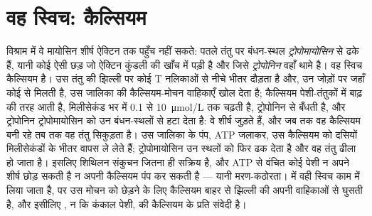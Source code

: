 \section{वह स्विच: कैल्सियम}

\begin{proposition}[उत्तेजन--संकुचन युग्मन]\label{prop:b2:muscle-movement:coupling}
विश्राम में वे मायोसिन शीर्ष ऐक्टिन तक पहुँच नहीं सकते: पतले तंतु पर
बंधन-स्थल \emph{ट्रोपोमायोसिन} से ढके हैं, यानी कोई ऐसी छड़
जो ऐक्टिन कुंडली की खाँच में पड़ी है और जिसे \emph{ट्रोपोनिन} वहाँ थामे है।
वह स्विच कैल्सियम है। उस तंतु की झिल्ली पर कोई 
T नलिकाओं से नीचे भीतर दौड़ता है और, उन जोड़ों पर
जहाँ कोई   से मिलती है, उस
जालिका की कैल्सियम-मोचन वाहिकाएँ खोल देता है; कैल्सियम पेशी-तंतुकों में बाढ़ की तरह आती है,
मिलीसेकंड भर में \qty{0.1}{} से \qty{10}{\micro mol/L} तक चढ़ती है,
ट्रोपोनिन से बँधती है, और ट्रोपोनिन ट्रोपोमायोसिन को उन बंधन-स्थलों से
हटा देता है: वे शीर्ष जुड़ते हैं, और जब तक वह कैल्सियम बनी रहे तब तक वह तंतु सिकुड़ता है।
उस जालिका के पंप, ATP जलाकर, उस कैल्सियम को
दसियों मिलीसेकंडों के भीतर वापस ले लेते हैं; ट्रोपोमायोसिन उन
स्थलों को फिर ढक देता है और वह तंतु ढीला हो जाता है। इसलिए शिथिलन
संकुचन जितना ही सक्रिय है, और ATP से वंचित कोई पेशी न अपने
शीर्ष छोड़ सकती है न अपनी कैल्सियम पंप कर सकती है --- यानी मरण-कठोरता।  में वही
स्विच काम में लिया जाता है, पर उस मोचन को छेड़ने के लिए कैल्सियम बाहर से झिल्ली की
अपनी वाहिकाओं से घुसती है, और इसीलिए
, न कि कंकाल पेशी,  की कैल्सियम के प्रति
संवेदी है।
\end{proposition}

